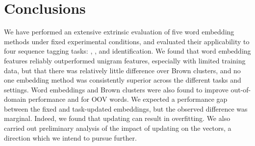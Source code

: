 \section{Conclusions}

We have performed an extensive extrinsic evaluation of five word embedding methods
under fixed experimental conditions, and evaluated their applicability to four sequence tagging tasks: \pos, \chunking, \ner and \mwe identification.
We found that word embedding features reliably outperformed unigram
features, especially with limited training data, but that there was
relatively little difference over Brown clusters, and
no one embedding method was consistently superior across the different tasks and settings.
Word embeddings and Brown clusters were also found to improve
out-of-domain performance and for OOV words.
We expected a performance gap between the fixed and task-updated embeddings, but the observed difference was marginal.
Indeed, we found that updating can result in overfitting.
We also carried out preliminary analysis of the impact of updating on
the vectors, a direction which we intend to pursue further.



